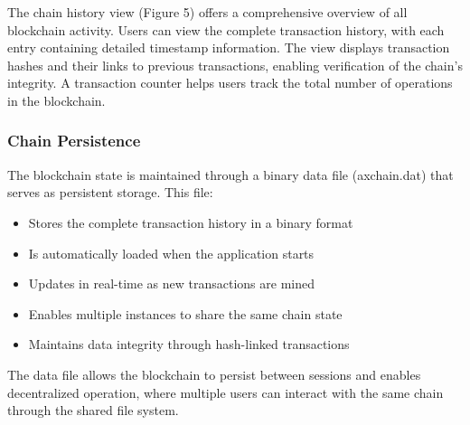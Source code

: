 \documentclass[12pt]{article}
\begin{document}
The chain history view (Figure 5) offers a comprehensive overview of all blockchain activity. Users can view the complete transaction history, with each entry containing detailed timestamp information. The view displays transaction hashes and their links to previous transactions, enabling verification of the chain's integrity. A transaction counter helps users track the total number of operations in the blockchain.

\subsubsection{Chain Persistence}
The blockchain state is maintained through a binary data file (axchain.dat) that serves as persistent storage. This file:
\begin{itemize}
\item Stores the complete transaction history in a binary format
\item Is automatically loaded when the application starts
\item Updates in real-time as new transactions are mined
\item Enables multiple instances to share the same chain state
\item Maintains data integrity through hash-linked transactions
\end{itemize}

The data file allows the blockchain to persist between sessions and enables decentralized operation, where multiple users can interact with the same chain through the shared file system.
\end{document}

